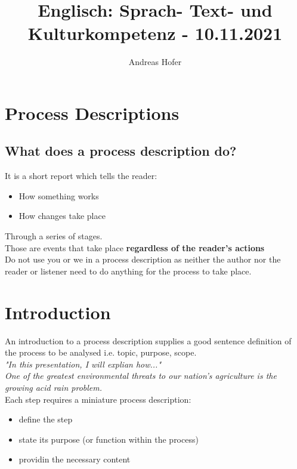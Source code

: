 \documentclass{article}
\title{Englisch: Sprach- Text- und Kulturkompetenz - 10.11.2021}
\author{Andreas Hofer}
\begin{document}
	\maketitle
	\section{Process Descriptions}
	\subsection{What does a process description do?}
	\normalsize
	It is a short report which tells the reader:
	\begin{itemize}
		\item{How something works}
		\item{How changes take place}
	\end{itemize}
	Through a series of stages. \\
	\large{Those are events that take place \textbf{regardless of the reader's actions}} \\
	\normalsize
	Do not use you or we in a process description as neither the author nor the reader or listener need to do anything for the process to take place. \\
	\section{Introduction}
	An introduction to a process description supplies a good sentence definition of the process to be analysed i.e. topic, purpose, scope. \\
	\large
	\textit{"In this presentation, I will explian how..."} \\
	\textit{One of the greatest environmental threats to our nation's agriculture is the growing acid rain problem.} \\
	\normalsize
	Each step requires a miniature process description:
	\begin{itemize}
		\item{define the step}
		\item{state its purpose (or function within the process)}
		\item{providin the necessary content}
	\end{itemize}
	
	
\end{document}

